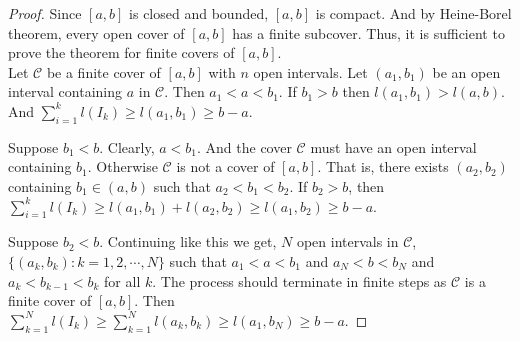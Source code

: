 \begin{enumerate}
\begin{proof}
	Since $[a,b]$ is closed and bounded, $[a,b]$ is compact.
	And by Heine-Borel theorem, every open cover of $[a,b]$ has a finite subcover.
	Thus, it is sufficient to prove the theorem for finite covers of $[a,b]$.\\

	Let $\mathcal{C}$ be a finite cover of $[a,b]$ with $n$ open intervals.
	Let $(a_1,b_1)$ be an open interval containing $a$ in $\mathcal{C}$.
	Then $a_1 < a < b_1$.
	If $b_1 > b$ then $l(a_1,b_1) > l(a,b)$.
	And $\displaystyle \sum_{i=1}^k l(I_k) \ge l(a_1,b_1) \ge b-a$.

\begin{center}
\end{center}

	Suppose $b_1 < b$.
	Clearly, $a < b_1$.
	And the cover $\mathcal{C}$ must have an open interval containing $b_1$.
	Otherwise $\mathcal{C}$ is not a cover of $[a,b]$.
	That is, there exists $(a_2,b_2)$ containing $b_1 \in (a,b)$ such that $a_2 < b_1 < b_2$.
	If $b_2 > b$, then $\displaystyle \sum_{i=1}^k l(I_k) \ge l(a_1,b_1) + l(a_2,b_2) \ge l(a_1,b_2) \ge b-a$.

\begin{center}
\end{center}

	Suppose $b_2 < b$.
	Continuing like this we get, $N$ open intervals in $\mathcal{C}$, $\{ (a_k,b_k) : k = 1,2,\cdots,N \} $ such that $a_1 < a < b_1$ and $a_N < b < b_N$ and $a_k < b_{k-1} < b_k$ for all $k$.
	The process should terminate in finite steps as $\mathcal{C}$ is a finite cover of $[a,b]$.
	Then $\displaystyle \sum_{k=1}^N l(I_k) \ge \sum_{k=1}^N l(a_k,b_k) \ge l(a_1,b_N) \ge b-a$.


\end{proof}
\end{enumerate}

